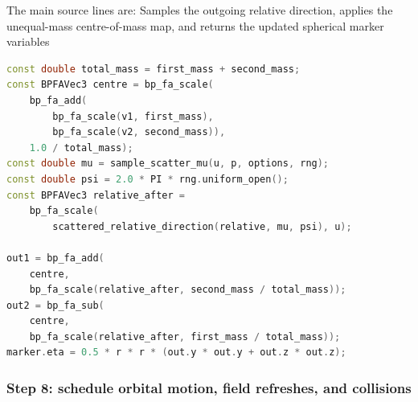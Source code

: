 The main source lines are:
{}
{Samples the outgoing relative direction, applies the unequal-mass
 centre-of-mass map, and returns the updated spherical marker variables}
\begin{lstlisting}[language=C++]
const double total_mass = first_mass + second_mass;
const BPFAVec3 centre = bp_fa_scale(
    bp_fa_add(
        bp_fa_scale(v1, first_mass),
        bp_fa_scale(v2, second_mass)),
    1.0 / total_mass);
const double mu = sample_scatter_mu(u, p, options, rng);
const double psi = 2.0 * PI * rng.uniform_open();
const BPFAVec3 relative_after =
    bp_fa_scale(
        scattered_relative_direction(relative, mu, psi), u);

out1 = bp_fa_add(
    centre,
    bp_fa_scale(relative_after, second_mass / total_mass));
out2 = bp_fa_sub(
    centre,
    bp_fa_scale(relative_after, first_mass / total_mass));
marker.eta = 0.5 * r * r * (out.y * out.y + out.z * out.z);
\end{lstlisting}

\subsubsection{Step 8: schedule orbital motion, field refreshes, and collisions}

